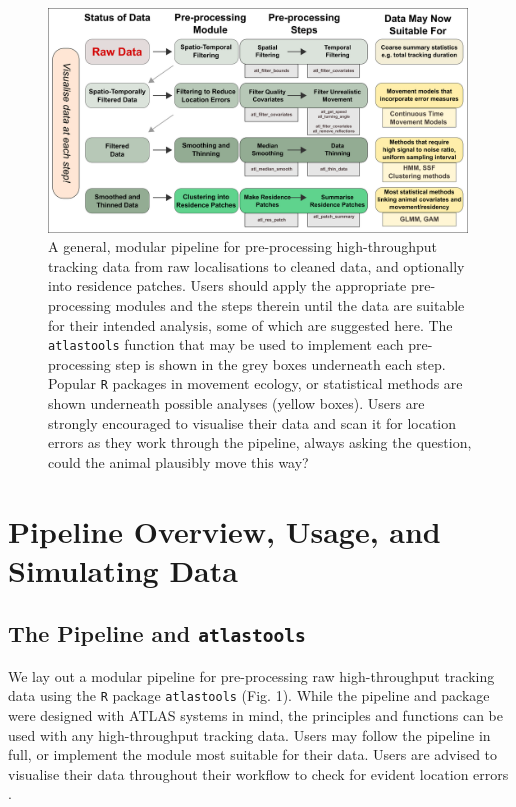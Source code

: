 \documentclass[10pt,paper=a4,headings=standardclasses
]{scrartcl}
\begin{document}
\begin{figure}
    \centering
    \includegraphics[width=0.99\textwidth]{figures/fig_01_recipe.png}
    \caption{A general, modular pipeline for pre-processing high-throughput tracking data from raw localisations to cleaned data, and optionally into residence patches. 
    Users should apply the appropriate pre-processing modules and the steps therein until the data are suitable for their intended analysis, some of which are suggested here.
    The \texttt{atlastools} function that may be used to implement each pre-processing step is shown in the grey boxes underneath each step.
    Popular \texttt{R} packages in movement ecology, or statistical methods are shown underneath possible analyses (yellow boxes).
    Users are strongly encouraged to visualise their data and scan it for location errors as they work through the pipeline, always asking the question, could the animal plausibly move this way?
    }
    \label{fig:figure_pipeline}
\end{figure}

\section{Pipeline Overview, Usage, and Simulating Data}

\subsection{The Pipeline and \texttt{atlastools}}

We lay out a modular pipeline for pre-processing raw high-throughput tracking data using the \texttt{R} package \texttt{atlastools} (Fig. 1).
While the pipeline and package were designed with ATLAS systems in mind, the principles and functions can be used with any high-throughput tracking data.
Users may follow the pipeline in full, or implement the module most suitable for their data.
Users are advised to visualise their data throughout their workflow to check for evident location errors \citep{slingsby2016}.
\end{document}
